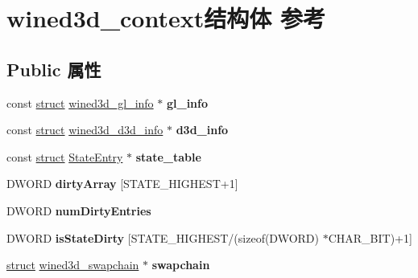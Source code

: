 \hypertarget{structwined3d__context}{}\section{wined3d\+\_\+context结构体 参考}
\label{structwined3d__context}
\subsection*{Public 属性}
\begin{DoxyCompactItemize}
\item 
\mbox{\label{structwined3d__context_a42f8b4ad765764d15a0144b53c3f8759}} 
const \hyperlink{interfacestruct}{struct} \hyperlink{structwined3d__gl__info}{wined3d\+\_\+gl\+\_\+info} $\ast$ {\bfseries gl\+\_\+info}
\item 
\mbox{\label{structwined3d__context_a9d791cbc0290b75517162cdfc32a7e7b}} 
const \hyperlink{interfacestruct}{struct} \hyperlink{structwined3d__d3d__info}{wined3d\+\_\+d3d\+\_\+info} $\ast$ {\bfseries d3d\+\_\+info}
\item 
\mbox{\label{structwined3d__context_a05f421d5c2c70372453a6822a2f235d3}} 
const \hyperlink{interfacestruct}{struct} \hyperlink{struct_state_entry}{State\+Entry} $\ast$ {\bfseries state\+\_\+table}
\item 
\mbox{\label{structwined3d__context_addfcb1ab1fa8936acc934f68a69b813d}} 
D\+W\+O\+RD {\bfseries dirty\+Array} \mbox{[}S\+T\+A\+T\+E\+\_\+\+H\+I\+G\+H\+E\+ST+1\mbox{]}
\item 
\mbox{\label{structwined3d__context_a1758411b975add966d94e8cb7f414287}} 
D\+W\+O\+RD {\bfseries num\+Dirty\+Entries}
\item 
\mbox{\label{structwined3d__context_a8a585e91a73dcfca6682033f1a28c970}} 
D\+W\+O\+RD {\bfseries is\+State\+Dirty} \mbox{[}S\+T\+A\+T\+E\+\_\+\+H\+I\+G\+H\+E\+ST/(sizeof(D\+W\+O\+RD) $\ast$C\+H\+A\+R\+\_\+\+B\+IT)+1\mbox{]}
\item 
\mbox{\label{structwined3d__context_a6ac5bf92b0f45b3ef115605966003270}} 
\hyperlink{interfacestruct}{struct} \hyperlink{structwined3d__swapchain}{wined3d\+\_\+swapchain} $\ast$ {\bfseries swapchain}

\end{DoxyCompactItemize}
